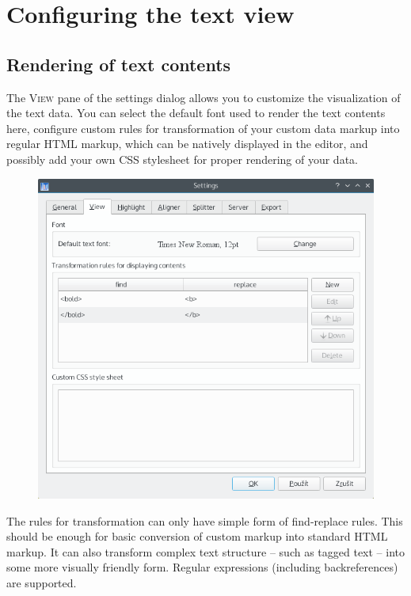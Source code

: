 \documentclass[a4paper,10pt,oneside]{book}
\newcommand{\menu}[1]{\textsc{#1}}
\begin{document}
\section{Configuring the text view}\label{ch:detail:config:editor}

\subsection{Rendering of text contents}

The \menu{View} pane of the settings dialog allows you to customize the visualization of the text data. You can select the default font used to render the text contents here, configure custom rules for transformation of your custom data markup into regular HTML markup, which can be natively displayed in the editor, and possibly add your own CSS stylesheet for proper rendering of your data.

\begin{figure}[htb]
 \includegraphics[width=\textwidth]{screenshots/settings_view.png}
\end{figure}

The rules for transformation can only have simple form of find-replace rules. This should be enough for basic conversion of custom markup into standard HTML markup. It can also transform complex text structure -- such as tagged text -- into some more visually friendly form. Regular expressions (including backreferences) are supported.
\end{document}
